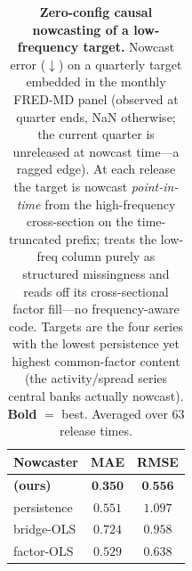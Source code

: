 \begin{table}[t]\centering\small
\setlength{\tabcolsep}{6pt}
\caption{\textbf{Zero-config causal nowcasting of a low-frequency target.} Nowcast error ($\downarrow$) on a quarterly target embedded in the monthly FRED-MD panel (observed at quarter ends, NaN otherwise; the current quarter is unreleased at nowcast time---a ragged edge). At each release the target is nowcast \emph{point-in-time} from the high-frequency cross-section on the time-truncated prefix; \cafe{} treats the low-freq column purely as structured missingness and reads off its cross-sectional factor fill---no frequency-aware code. Targets are the four series with the lowest persistence yet highest common-factor content (the activity/spread series central banks actually nowcast). \textbf{Bold} $=$ best. Averaged over 63 release times.}
\label{tab:mixedfreq}
\begin{tabular}{@{}lcc@{}}
\toprule
Nowcaster & MAE & RMSE \\
\midrule
\textbf{\cafe{} (ours)} & $\textbf{0.350}$ & $\textbf{0.556}$ \\
persistence & $0.551$ & $1.097$ \\
bridge-OLS & $0.724$ & $0.958$ \\
factor-OLS & $0.529$ & $0.638$ \\
\bottomrule
\end{tabular}
\end{table}
